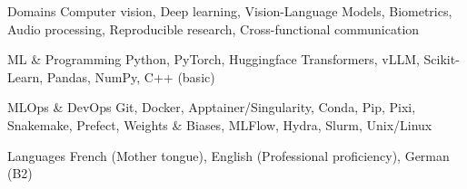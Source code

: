 

\begin{cvskills}

  \cvskill
    {Domains} %
    {Computer vision, Deep learning, Vision-Language Models, Biometrics, Audio processing, Reproducible research, Cross-functional communication} %

  \cvskill
    {ML \& Programming} %
    {Python, PyTorch, Huggingface Transformers, vLLM, Scikit-Learn, Pandas, NumPy, C++ (basic)} %

  \cvskill
    {MLOps \& DevOps} %
    {Git, Docker, Apptainer/Singularity, Conda, Pip, Pixi, Snakemake, Prefect, Weights \& Biases, MLFlow, Hydra, Slurm, Unix/Linux} %

  \cvskill
    {Languages} %
    {French (Mother tongue), English (Professional proficiency), German (B2)} %

\end{cvskills}
